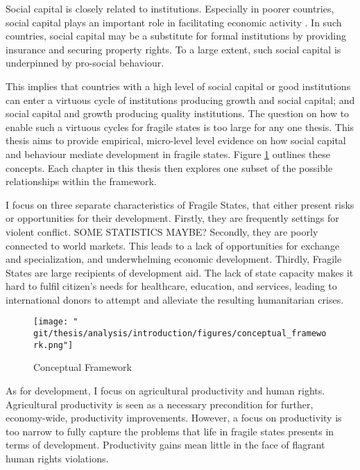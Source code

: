 %
Social capital is closely related to institutions.  Especially in poorer countries, social capital plays an important role in facilitating economic activity \citep{Knack1997}. In such countries, social capital may be a substitute for formal institutions by providing insurance and securing property rights. To a large extent, such social capital is underpinned by pro-social behaviour. 

This implies that countries with a high level of social capital or good institutions can enter a virtuous cycle of institutions producing growth and social capital; and social capital and growth producing quality institutions. The question on how to enable such a virtuous cycles for fragile states is too large for any one thesis. This thesis aims to provide empirical, micro-level level evidence on how social capital and behaviour mediate development in fragile states. Figure \ref{fig:intro_framework} outlines these concepts. Each chapter in this thesis then explores one subset of the possible relationships within the framework.

I focus on three separate characteristics of Fragile States, that either present risks or opportunities for their development. Firstly, they are frequently settings for violent conflict. SOME STATISTICS MAYBE? Secondly, they are poorly connected to world markets. This leads to a lack of opportunities for exchange and specialization, and underwhelming economic development. Thirdly, Fragile States are large recipients of development aid. The lack of state capacity makes it hard to fulfil citizen's needs for healthcare, education, and services, leading to international donors to attempt and alleviate the resulting humanitarian crises.

\begin{figure}[htb]
  \centering
  \texttt{[image: "\\git/thesis/analysis/introduction/figures/conceptual\_framework.png"]}
  \caption{Conceptual Framework}
  \label{fig:intro_framework}
\end{figure}

As for development, I focus on agricultural productivity and human rights. Agricultural productivity is seen as a necessary precondition for further, economy-wide, productivity improvements.  However, a focus on productivity is too narrow to fully capture the problems that life in fragile states presents in terms of development.   Productivity gains mean little in the face of flagrant human rights violations.

